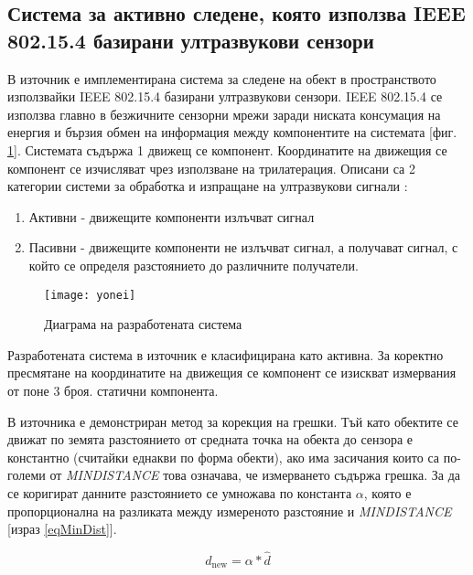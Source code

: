 \subsection{Система за активно следене, която използва IEEE 802.15.4 базирани ултразвукови сензори} \label{yoneiSection}

В източник \cite{yonei} е имплементирана система за следене на обект в пространството използвайки IEEE 802.15.4 базирани ултразвукови сензори.
IEEE 802.15.4 се използва главно в безжичните сензорни мрежи заради ниската консумация на енергия и бързия обмен на информация между компонентите на системата [фиг. \ref{fig:yoneiFig}]. Системата съдържа 1 движещ се компонент. Координатите на движещия се компонент се изчисляват чрез използване на трилатерация.  Описани са 2 категории системи за обработка и изпращане на ултразвукови сигнали \cite{sysTypes}:

\begin{enumerate}
    \item Активни - движещите компоненти излъчват сигнал
    \item Пасивни - движещите компоненти не излъчват сигнал, а получават сигнал, с който се определя разстоянието до различните получатели.
\end{enumerate}

\begin{figure}
    \centering
    \texttt{[image: yonei]}
    \caption{Диаграма на разработената система}
    \label{fig:yoneiFig}
\end{figure}

Разработената система в източник \cite{yonei} е класифицирана като активна. За коректно пресмятане на координатите на движещия се компонент се изискват измервания от поне 3 броя. статични компонента. 

В източника е демонстриран метод за корекция на грешки. Тъй като обектите се движат по земята разстоянието от средната точка на обекта до сензора е константно (считайки еднакви по форма обекти), ако има засичания които са по-големи от \textit{MINDISTANCE} това означава, че измерването съдържа грешка. За да се коригират данните разстоянието се умножава по константа $\alpha$, която е пропорционална на разликата между измереното разстояние и \textit{MINDISTANCE} [израз \ref{eqMinDist}].

\begin{equation} \label{eqMinDist}
    d_{\text{new}} = \alpha * \hat{d}
\end{equation}